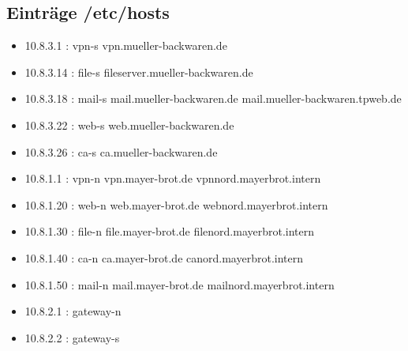 \subsection{Einträge /etc/hosts}
\begin{itemize}
  \item 10.8.3.1 : vpn-s vpn.mueller-backwaren.de
  \item 10.8.3.14 : file-s fileserver.mueller-backwaren.de
  \item 10.8.3.18 : mail-s mail.mueller-backwaren.de mail.mueller-backwaren.tpweb.de
  \item 10.8.3.22 : web-s web.mueller-backwaren.de
  \item 10.8.3.26 : ca-s ca.mueller-backwaren.de
  \item 10.8.1.1 : vpn-n vpn.mayer-brot.de vpnnord.mayerbrot.intern
  \item 10.8.1.20 : web-n web.mayer-brot.de webnord.mayerbrot.intern
  \item 10.8.1.30 : file-n file.mayer-brot.de filenord.mayerbrot.intern
  \item 10.8.1.40 : ca-n ca.mayer-brot.de canord.mayerbrot.intern
  \item 10.8.1.50 : mail-n mail.mayer-brot.de mailnord.mayerbrot.intern
  \item 10.8.2.1 : gateway-n
  \item 10.8.2.2 : gateway-s
\end{itemize}

